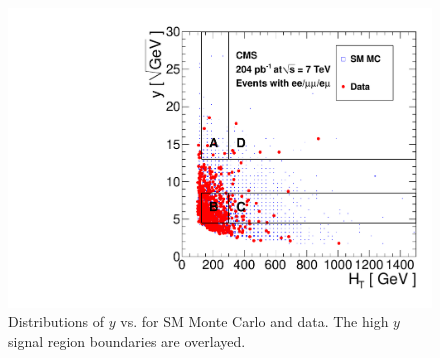 \begin{figure}[tbh]
\begin{center}
\includegraphics[width=0.75\linewidth]{plots/abcd_204pb_highy.pdf}
\caption{\label{fig:abcdData2}\protect Distributions of $y$ 
vs. \Ht for SM Monte Carlo and data. The high $y$ signal region boundaries are overlayed.}
\end{center}
\end{figure}


